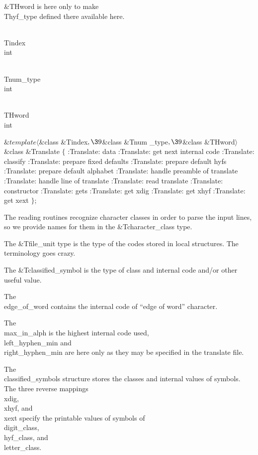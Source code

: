 \&{THword} is here only to make \\{Thyf\_type} defined there available here.

\Y\B\F\\{Tindex} \5
\\{int}\par
\B\F\\{Tnum\_type} \5
\\{int}\par
\B\F\\{THword} \5
\\{int}\par
\Y\B$\&{template}\langle{}$\&{class} \&{Tindex}${},\39{}$\&{class} \&{Tnum%
\_type}${},\39{}$\&{class} \&{THword}${}\rangle{}$\6
\&{class} \&{Translate} ${}\{{}$\1\6
:Translate: data\X\6
:Translate: get next internal code\X\7
:Translate: classify\X\7
:Translate: prepare fixed defaults\X\6
:Translate: prepare default hyfs\X\6
:Translate: prepare default alphabet\X\6
:Translate: handle preamble of translate\X\6
:Translate: handle line of translate\X\6
:Translate: read translate\X\6
:Translate: constructor\X\7
:Translate: gets\X\6
:Translate: get xdig\X\6
:Translate: get xhyf\X\6
:Translate: get xext\X\2\6
${}\}{}$;\par
\fi

The reading routines recognize character classes in order to parse the
input lines, so we provide names for them in the \&{Tcharacter\_class} type.

The \&{Tfile\_unit} type is the type of the codes stored in local
structures. The terminology goes crazy.

The \&{Tclassified\_symbol} is the type of class and internal code and/or
other useful value.

The \\{edge\_of\_word} contains the internal code of
``edge of word'' character.

The \\{max\_in\_alph} is the highest internal code used, \\{left\_hyphen\_min}
and \\{right\_hyphen\_min} are here only as they may be specified in the
translate file.

The \\{classified\_symbols} structure stores the classes and internal
values of symbols. The three reverse mappings \\{xdig}, \\{xhyf}, and \\{xext}
specify the printable values of symbols of \\{digit\_class}, \\{hyf\_class},
and \\{letter\_class}.

